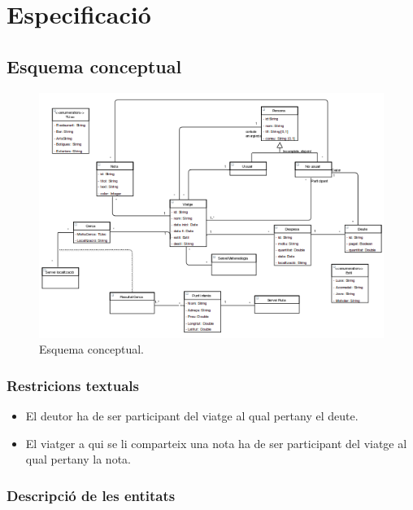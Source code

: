 
\chapter{Especificació} %

\label{Especificacio} %

\section{Esquema conceptual}


\begin{figure}[!h]
\centering
\includegraphics[scale=1]{Figures/UML.png}
\caption{Esquema conceptual.}
\end{figure}


\subsection{Restricions textuals}
\begin{itemize}
\item{}El deutor ha de ser participant del viatge al qual pertany el deute.
\item{}El viatger a qui se li comparteix una nota ha de ser participant del viatge al qual pertany la nota.
\end{itemize}

\clearpage

\subsection{Descripció de les entitats}


